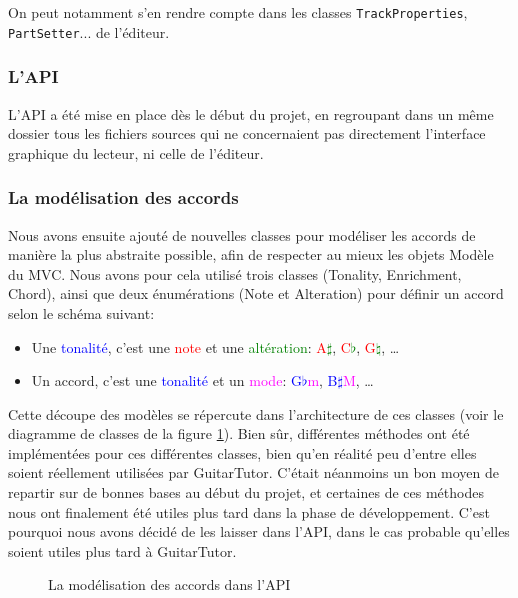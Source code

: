 On peut notamment s'en rendre compte dans les classes \texttt{TrackProperties}, \texttt{PartSetter}... de l'éditeur.
\subsubsection{L'API}

L'API a été mise en place dès le début du projet, en regroupant dans un même dossier tous les fichiers sources qui ne concernaient pas directement l'interface graphique du lecteur, ni celle de l'éditeur.

\subsubsection*{La modélisation des accords}

Nous avons ensuite ajouté de nouvelles classes pour modéliser les accords de manière la plus abstraite possible, afin de respecter au mieux les objets Modèle du MVC. Nous avons pour cela utilisé trois classes (Tonality, Enrichment, Chord), ainsi que deux énumérations (Note et Alteration) pour définir un accord selon le schéma suivant:
\begin{itemize}
 \item Une \textcolor{blue}{tonalité}, c'est une \textcolor{red}{note} et une \textcolor{green}{altération}: \textcolor{red}{A}\textcolor{green}{$\sharp$}, \textcolor{red}{C}\textcolor{green}{$\flat$}, \textcolor{red}{G}\textcolor{green}{$\natural$}, \dots
 \item Un accord, c'est une \textcolor{blue}{tonalité} et un \textcolor{magenta}{mode}: \textcolor{blue}{G$\flat$}\textcolor{magenta}{m}, \textcolor{blue}{B$\sharp$}\textcolor{magenta}{M}, \dots
\end{itemize}

Cette découpe des modèles se répercute dans l'architecture de ces classes (voir le diagramme de classes de la figure \ref{diag_api_chords}). Bien sûr, différentes méthodes ont été implémentées pour ces différentes classes, bien qu'en réalité peu d'entre elles soient réellement utilisées par GuitarTutor. C'était néanmoins un bon moyen de repartir sur de bonnes bases au début du projet, et certaines de ces méthodes nous ont finalement été utiles plus tard dans la phase de développement. C'est pourquoi nous avons décidé de les laisser dans l'API, dans le cas probable qu'elles soient utiles plus tard à GuitarTutor.

\begin{figure}[H]
\begin{center}
\caption{La modélisation des accords dans l'API}
\label{diag_api_chords}
\end{center}
\end{figure}

